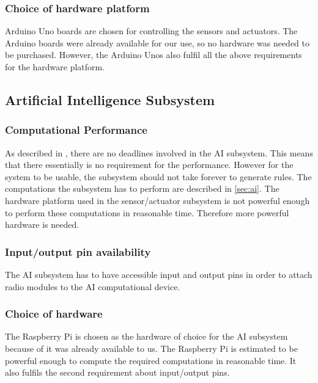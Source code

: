 \subsubsection{Choice of hardware platform}
Arduino Uno boards are chosen for controlling the sensors and actuators. The Arduino boards were already available for our use, so no hardware was needed to be purchased. However, the Arduino Unos also fulfil all the above requirements for the hardware platform.

\subsection{Artificial Intelligence Subsystem}

\subsubsection{Computational Performance}
As described in , there are no deadlines involved in the AI subsystem. This means that there essentially is no requirement for the performance. However for the system to be usable, the subsystem should not take forever to generate rules. The computations the subsystem has to perform are described in \cref{sec:ai}. The hardware platform used in the sensor/actuator subsystem is not powerful enough to perform these computations in reasonable time. Therefore more powerful hardware is needed.

\subsubsection{Input/output pin availability}
The AI subsystem has to have accessible input and output pins in order to attach radio modules to the AI computational device.

\subsubsection{Choice of hardware}
The Raspberry Pi is chosen as the hardware of choice for the AI subsystem because of it was already available to us. The Raspberry Pi is estimated to be powerful enough to compute the required computations in reasonable time. It also fulfils the second requirement about input/output pins.

